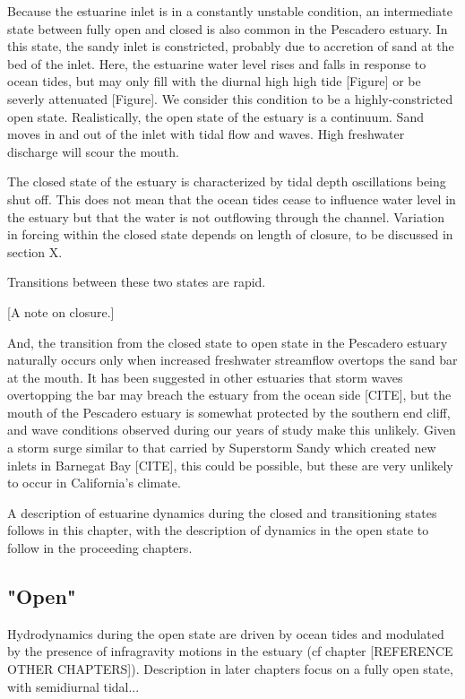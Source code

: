 
Because the estuarine inlet is in a constantly unstable condition, an
intermediate state between fully open and closed is also common in the
Pescadero estuary.  In this state, the sandy inlet is constricted,
probably due to accretion of sand at the bed of the inlet. Here, the
estuarine water level rises and falls in response to ocean tides, but
may only fill with the diurnal high high tide [Figure] or be severly
attenuated [Figure]. We consider this condition to be a
highly-constricted open state. Realistically, the open state of the
estuary is a continuum. Sand moves in and out of the inlet with tidal
flow and waves. High freshwater discharge will scour the mouth.

The closed state of the estuary is characterized by tidal depth
oscillations being shut off. This does not mean that the ocean tides
cease to influence water level in the estuary but that the water is not
outflowing through the channel. Variation in forcing within the closed
state depends on length of closure, to be discussed in section {X}.

Transitions between these two states are rapid.

[A note on closure.]

And, the transition from the closed state to open state in the Pescadero
estuary naturally occurs only when increased freshwater streamflow
overtops the sand bar at the mouth. It has been suggested in other
estuaries that storm waves overtopping the bar may breach the estuary
from the ocean side [CITE], but the mouth of the Pescadero estuary is
somewhat protected by the southern end cliff, and wave conditions
observed during our years of study make this unlikely. Given a storm
surge similar to that carried by Superstorm Sandy which created new
inlets in Barnegat Bay [CITE], this could be possible, but these are
very unlikely to occur in California's climate.

A description of estuarine dynamics during the closed and transitioning
states follows in this chapter, with the description of dynamics in the
open state to follow in the proceeding chapters.

\subsection{"Open"} \label{opench2}
Hydrodynamics during the open state are driven by ocean tides and modulated by the presence of infragravity motions in the 
estuary (cf chapter [REFERENCE OTHER CHAPTERS]). Description in later chapters focus on a fully open state, with 
semidiurnal tidal...


